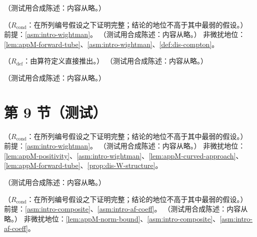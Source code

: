\begin{example}\label{ex:appM-forward-oneloop}
（测试用合成陈述：内容从略。）
\end{example}

\begin{lemma}\label{lem:appM-forward-tube}
（$R_{\mathrm{cond}}$：在所列编号假设之下证明完整；结论的地位不高于其中最弱的假设。）
前提：\cref{asm:intro-wightman}。
（测试用合成陈述：内容从略。）
非微扰地位：\cref{lem:appM-forward-tube}、\cref{asm:intro-wightman}、\cref{def:dis-compton}。
\end{lemma}

\begin{lemma}[$\hat P=0$ 点的不变量论证 \tagR]\label{lem:appM-hatP-zero}
（$R_{\mathrm{def}}$：由算符定义直接推出。）
（测试用合成陈述：内容从略。）
\end{lemma}

\begin{lemma}[沿弯曲路径逼近的边界值]\label{lem:appM-curved-approach}
（测试用合成陈述：内容从略。）
\end{lemma}

\section{第 9 节（测试）}\label{sec:appM-status}

\begin{lemma}\label{lem:appM-positivity}
（$R_{\mathrm{cond}}$：在所列编号假设之下证明完整；结论的地位不高于其中最弱的假设。）
前提：\cref{asm:intro-wightman}。
（测试用合成陈述：内容从略。）
非微扰地位：\cref{lem:appM-positivity}、\cref{asm:intro-wightman}、\cref{lem:appM-curved-approach}、\cref{lem:appM-forward-tube}、\cref{prop:dis-W-structure}。
\end{lemma}

\begin{lemma}\label{lem:appM-green}
（测试用合成陈述：内容从略。）
\end{lemma}

\begin{lemma}\label{lem:appM-norm-bound}
（$R_{\mathrm{cond}}$：在所列编号假设之下证明完整；结论的地位不高于其中最弱的假设。）
前提：\cref{asm:intro-composite}、\cref{asm:intro-af-coeff}。
（测试用合成陈述：内容从略。）
非微扰地位：\cref{lem:appM-norm-bound}、\cref{asm:intro-composite}、\cref{asm:intro-af-coeff}。
\end{lemma}

